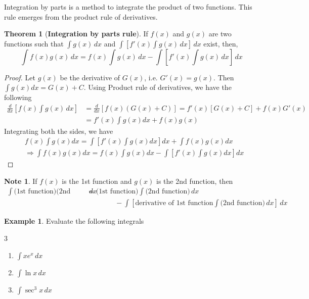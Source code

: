 \documentclass{book}
\theoremstyle{definition}
\newtheorem{theorem}{Theorem}[section]
\newtheorem{example}{Example}[section]
\newtheorem*{note}{Note}
\begin{document}
Integration by parts is a method to integrate the product of two functions. This rule emerges from the product rule of derivatives.

\begin{theorem}[\textbf{Integration by parts rule}]
If $f(x)$ and $g(x)$ are two functions such that $\int g(x)\,dx$ and $\int [f'(x)\int g(x)\,dx]\,dx$ exist, then, 
\[
\int f(x)g(x)\,dx = f(x)\int g(x)\,dx-\int \left[f'(x)\int g(x)\,dx\right]\,dx
\]
\end{theorem}

\begin{proof}
Let $g(x)$ be the derivative of $G(x)$, i.e. $G'(x)=g(x)$. Then $\int g(x)dx=G(x)+C$. Using Product rule of derivatives, we have the following
\begin{align*}
    \frac{d}{dx}\left[f(x)\int g(x)\,dx\right] &= \frac{d}{dx}\left[f(x)(G(x)+C)\right] = f'(x)[G(x)+C]+f(x)G'(x) \\
    &= f'(x)\int g(x)dx+f(x)g(x)
\end{align*}
Integrating both the sides, we have
\begin{align*}
    & f(x)\int g(x)dx=\int \left[f'(x)\int g(x)dx\right]dx+\int f(x)g(x)dx \\
    &\Rightarrow \int f(x)g(x)dx=f(x)\int g(x)dx-\int \left[f'(x)\int g(x)dx\right]dx
\end{align*}
\end{proof}

\begin{note}
If $f(x)$ is the 1st function and $g(x)$ is the 2nd function, then
\begin{align*}
\int \text{(1st function)(2nd function)}\, dx &= \text{(1st function)}\int\text{(2nd function)}\,dx \\
&\qquad\qquad- \int\left[\text{derivative of 1st function}\int\text{(2nd function)}\,dx\right]\,dx    
\end{align*}
\end{note}


\begin{example}
Evaluate the following integrals
\begin{multicols}{3}

\begin{enumerate}[label=(\roman*)]
    \item $\int xe^x\,dx$
    \item $\int \ln x\,dx$
    \item $\int \sec^3 x\,dx$

\end{enumerate}
\end{multicols}    
\end{example}
\end{document}
